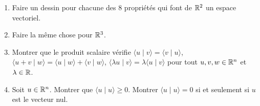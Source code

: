 \begin{frame}
\begin{miniexercice}
\begin{enumerate}
  \item Faire un dessin pour chacune des $8$ propriétés qui font de $\mathbb{R}^2$ un espace vectoriel.
  
  \item Faire la même chose pour $\mathbb{R}^3$.
  
  \item Montrer que le produit scalaire vérifie 
  $\langle u \mid v \rangle = \langle v \mid u \rangle$,
  $\langle u+v \mid w \rangle = \langle u \mid w \rangle + \langle v \mid w \rangle$,
  $\langle \lambda u \mid v \rangle = \lambda\langle  u \mid v \rangle$ pour tout $u,v,w \in \mathbb{R}^n$ et $\lambda\in \mathbb{R}$.
  
  \item Soit $u\in \mathbb{R}^n$. Montrer que $\langle u \mid u \rangle \ge 0$. 
  Montrer $\langle u \mid u \rangle = 0$ si et seulement si $u$ est le vecteur nul.
\end{enumerate}
\end{miniexercice}
\end{frame}


